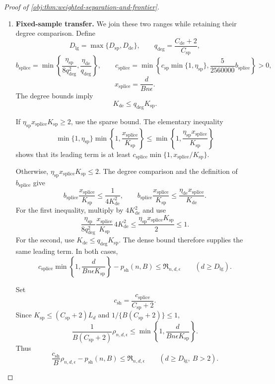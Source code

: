 \documentclass[11pt]{article}
\begin{document}
\begin{proof}[Proof of \cref{obj:thm:weighted-separation-and-frontier}]
\begin{enumerate}
\item
\textbf{Fixed-sample transfer.}\quad
We join these two ranges while retaining their degree comparison. Define
\[
D_{\mathrm{lg}}=\max\{D_{\mathrm{sp}},D_{\mathrm{de}}\},
\qquad
q_{\mathrm{deg}}=\frac{C_{\mathrm{de}}+2}{C_{\mathrm{sp}}},
\]
\[
b_{\mathrm{splice}}
=\min\left\{
\frac{\eta_{\mathrm{sp}}}{8q_{\mathrm{deg}}^2},
\frac{\eta_{\mathrm{de}}}{q_{\mathrm{deg}}}
\right\},
\qquad
c_{\mathrm{splice}}
=\min\left\{
c_{\mathrm{sp}}\min\{1,\eta_{\mathrm{sp}}\},
\frac5{2560000}b_{\mathrm{splice}}
\right\}>0,
\]
\[
x_{\mathrm{splice}}=\frac d{Bn\epsilon}.
\]
The degree bounds imply
\[
K_{\mathrm{de}}\le q_{\mathrm{deg}}K_{\mathrm{sp}}.
\]

If \(\eta_{\mathrm{sp}}x_{\mathrm{splice}}K_{\mathrm{sp}}\ge2\), use the sparse bound. The elementary inequality
\[
\min\{1,\eta_{\mathrm{sp}}\}
\min\left\{1,\frac{x_{\mathrm{splice}}}{K_{\mathrm{sp}}}\right\}
\le
\min\left\{1,
\frac{\eta_{\mathrm{sp}}x_{\mathrm{splice}}}{K_{\mathrm{sp}}}\right\}
\]
shows that its leading term is at least
\(c_{\mathrm{splice}}\min\{1,x_{\mathrm{splice}}/K_{\mathrm{sp}}\}\).

Otherwise,
\(\eta_{\mathrm{sp}}x_{\mathrm{splice}}K_{\mathrm{sp}}\le2\).
The degree comparison and the definition of \(b_{\mathrm{splice}}\) give
\[
b_{\mathrm{splice}}
\frac{x_{\mathrm{splice}}}{K_{\mathrm{sp}}}
\le\frac1{4K_{\mathrm{de}}^2},
\qquad
b_{\mathrm{splice}}
\frac{x_{\mathrm{splice}}}{K_{\mathrm{sp}}}
\le\frac{\eta_{\mathrm{de}}x_{\mathrm{splice}}}{K_{\mathrm{de}}}.
\]
For the first inequality, multiply by \(4K_{\mathrm{de}}^2\) and use
\[
\frac{\eta_{\mathrm{sp}}}{8q_{\mathrm{deg}}^2}
\frac{x_{\mathrm{splice}}}{K_{\mathrm{sp}}}
\,4K_{\mathrm{de}}^2
\le\frac{\eta_{\mathrm{sp}}x_{\mathrm{splice}}K_{\mathrm{sp}}}{2}
\le1.
\]
For the second, use
\(K_{\mathrm{de}}\le q_{\mathrm{deg}}K_{\mathrm{sp}}\).
The dense bound therefore supplies the same leading term. In both cases,
\[
c_{\mathrm{splice}}
\min\left\{1,\frac d{Bn\epsilon K_{\mathrm{sp}}}\right\}
-p_{\mathrm{sh}}(n,B)
\le\mathfrak R_{n,d,\epsilon}
\qquad(d\ge D_{\mathrm{lg}}).
\]

Set
\[
c_{\mathrm{sh}}=\frac{c_{\mathrm{splice}}}{C_{\mathrm{sp}}+2}.
\]
Since \(K_{\mathrm{sp}}\le(C_{\mathrm{sp}}+2)L_d\) and
\(1/\{B(C_{\mathrm{sp}}+2)\}\le1\),
\[
\frac1{B(C_{\mathrm{sp}}+2)}\rho_{n,d,\epsilon}
\le
\min\left\{1,\frac d{Bn\epsilon K_{\mathrm{sp}}}\right\}.
\]
Thus
\[
\frac{c_{\mathrm{sh}}}{B}\rho_{n,d,\epsilon}
-p_{\mathrm{sh}}(n,B)
\le\mathfrak R_{n,d,\epsilon}
\qquad(d\ge D_{\mathrm{lg}},\ B>2).
\]


\end{enumerate}
\end{proof}
\end{document}
